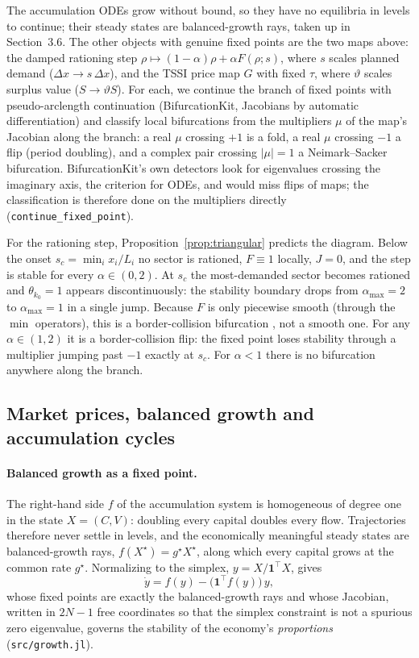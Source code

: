 \documentclass[11pt]{article}
\begin{document}
The accumulation ODEs grow without bound, so they have no equilibria in
levels to continue; their steady states are balanced-growth rays, taken
up in Section~3.6. The other objects with genuine fixed points are the
two maps above: the damped rationing step $\rho\mapsto(1-\alpha)\rho+\alpha F(\rho;s)$,
where $s$ scales planned demand ($\Delta x\to s\,\Delta x$), and the
TSSI price map $G$ with fixed $\tau$, where $\vartheta$ scales surplus
value ($S\to\vartheta S$). For each, we continue the branch of fixed
points with pseudo-arclength continuation (BifurcationKit, Jacobians by
automatic differentiation) and classify local bifurcations from the
multipliers $\mu$ of the map's Jacobian along the branch: a real
$\mu$ crossing $+1$ is a fold, a real $\mu$ crossing $-1$ a flip
(period doubling), and a complex pair crossing $|\mu|=1$ a
Neimark--Sacker bifurcation. BifurcationKit's own detectors look for
eigenvalues crossing the imaginary axis, the criterion for ODEs, and
would miss flips of maps; the classification is therefore done on the
multipliers directly (\texttt{continue\_fixed\_point}).

For the rationing step, Proposition~\ref{prop:triangular} predicts the
diagram. Below the onset $s_c=\min_i x_i/L_i$ no sector is rationed,
$F\equiv1$ locally, $J=0$, and the step is stable for every
$\alpha\in(0,2)$. At $s_c$ the most-demanded sector becomes rationed and
$\theta_{k_0}=1$ appears discontinuously: the stability boundary drops
from $\alpha_{\max}=2$ to $\alpha_{\max}=1$ in a single jump. Because $F$
is only piecewise smooth (through the $\min$ operators), this is a
border-collision bifurcation \citep{nusse1992border}, not a smooth one.
For any $\alpha\in(1,2)$ it is a border-collision flip: the fixed point
loses stability through a multiplier jumping past $-1$ exactly at $s_c$.
For $\alpha<1$ there is no bifurcation anywhere along the branch.

\subsection{Market prices, balanced growth and accumulation cycles}

\paragraph{Balanced growth as a fixed point.} The right-hand side $f$ of
the accumulation system is homogeneous of degree one in the state
$X=(C,V)$: doubling every capital doubles every flow. Trajectories
therefore never settle in levels, and the economically meaningful steady
states are balanced-growth rays, $f(X^\star)=g^\star X^\star$, along which
every capital grows at the common rate $g^\star$. Normalizing to the
simplex, $y=X/\mathbf 1^{\top}X$, gives
\begin{equation}
  \dot y = f(y) - \big(\mathbf 1^{\top} f(y)\big)\,y,
  \label{eq:normalized}
\end{equation}
whose fixed points are exactly the balanced-growth rays and whose
Jacobian, written in $2N-1$ free coordinates so that the simplex
constraint is not a spurious zero eigenvalue, governs the stability of
the economy's \emph{proportions} (\texttt{src/growth.jl}).
\end{document}
